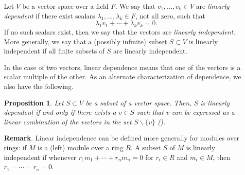 \documentclass[12pt]{article}
\newtheorem{proposition}{Proposition}
\begin{document}
Let $V$ be a vector space over a
field $F$. We say that $v_1,\ldots, v_k\in V$ are \emph{linearly dependent} if there exist scalars $\lambda_1,\ldots, \lambda_k\in F$, not all zero, such that
\[
\lambda_1 v_1+  \cdots  +\lambda_k v_k = 0 .
\]
If no such scalars exist, then we say that the vectors are \emph{linearly independent}. 
More generally, we say that a (possibly infinite) subset $S\subset V$ is linearly independent if all finite subsets of $S$ are linearly independent.

In the case of two vectors, linear dependence means that one of the
vectors is a scalar multiple of the other.  As an alternate
characterization of dependence, we also have the following.
\begin{proposition}
  Let $S\subset V$ be a subset of a vector space.  Then, $S$ is
  linearly dependent if and only if there exists a $v\in S$ such that
  $v$ can be expressed as a linear combination of the vectors in the
  set $S\backslash \{v\}$ ().
\end{proposition}

\textbf{Remark}.  Linear independence can be defined more generally for modules over rings: if $M$ is a (left) module over a ring $R$.  A subset $S$ of $M$ is linearly independent if whenever $r_1m_1+\cdots +r_nm_n=0$ for $r_i\in R$ and $m_i\in M$, then $r_1=\cdots =r_n=0$.
\end{document}
